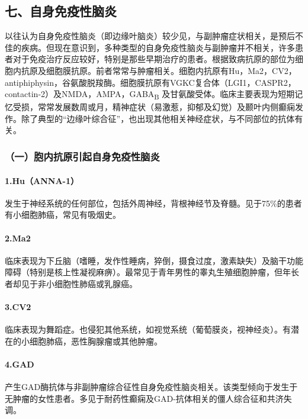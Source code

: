 \subsection{七、自身免疫性脑炎}

以往认为自身免疫性脑炎（即边缘叶脑炎）较少见，与副肿瘤症状相关，是预后不佳的疾病。但现在意识到，多种类型的自身免疫性脑炎与副肿瘤并不相关，许多患者对于免疫治疗反应较好，特别是那些早期治疗的患者。根据致病抗原的部位为细胞内抗原及细胞膜抗原。前者常常与肿瘤相关。细胞内抗原有Hu，Ma2，CV2，antiphiphysin，谷氨酸脱羧酶。细胞膜抗原有VGKC复合体（LGI1，CASPR2，contactin-2）及NMDA，AMPA，GABA\textsubscript{B}
及甘氨酸受体。临床主要表现为短期记忆受损，常常发展数周或月，精神症状（易激惹，抑郁及幻觉）及颞叶内侧癫痫发作。除了典型的“边缘叶综合征”，也出现其他相关神经症状，与不同部位的抗体有关。

\subsubsection{（一）胞内抗原引起自身免疫性脑炎}

\paragraph{1.Hu（ANNA-1）}

发生于神经系统的任何部位，包括外周神经，背根神经节及脊髓。见于75\%的患者有小细胞肺癌，常见有吸烟史。

\paragraph{2.Ma2}

临床表现为下丘脑（嗜睡，发作性睡病，猝倒，摄食过度，激素缺失）及脑干功能障碍（特别是核上性凝视麻痹）。最常见于青年男性的睾丸生殖细胞肿瘤，但年长者却见于非小细胞性肺癌或乳腺癌。

\paragraph{3.CV2}

临床表现为舞蹈症。也侵犯其他系统，如视觉系统（葡萄膜炎，视神经炎）。有潜在的小细胞肺癌，恶性胸腺瘤或其他肿瘤。

\paragraph{4.GAD}

产生GAD酶抗体与非副肿瘤综合征性自身免疫性脑炎相关。该类型倾向于发生于无肿瘤的女性患者。多见于耐药性癫痫及GAD-抗体相关的僵人综合征和共济失调。

